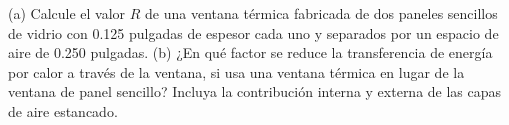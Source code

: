 \item (a) Calcule el valor $R$ de una ventana térmica fabricada de dos paneles sencillos de vidrio con 0.125 pulgadas de espesor cada uno y separados por un espacio de aire de 0.250 pulgadas. (b) ¿En qué factor se reduce la transferencia de energía por calor a través de la ventana, si usa una ventana térmica en lugar de la ventana de panel sencillo? Incluya la contribución interna y externa de las capas de aire estancado.
